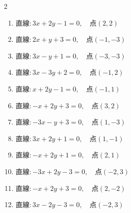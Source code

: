 \begin{multicols}{2}
\begin{enumerate}
  \item $直線:3x+2y-1=0,\quad 点 ( 2, 2 )$


  \item $直線:2x+y+3=0,\quad 点 ( -1, -3 )$


  \item $直線:3x-y+1=0,\quad 点 ( -3, -3 )$


  \item $直線:3x-3y+2=0,\quad 点 ( -1, 2 )$


  \item $直線:x+2y-1=0,\quad 点 ( -1, 1 )$

        \phantom{$\displaystyle 距離 : 0$}

  \item $直線:-x+2y+3=0,\quad 点 ( 3, 2 )$


  \item $直線:-3x-y+3=0,\quad 点 ( 1, -3 )$


\columnbreak %

  \item $直線:3x+2y+1=0,\quad 点 ( 1, -1 )$


  \item $直線:-x+2y+1=0,\quad 点 ( 2, 1 )$


  \item $直線:-3x+2y-3=0,\quad 点 ( -2, 3 )$


  \item $直線:-x+2y+3=0,\quad 点 ( 2, -2 )$


  \item $直線:3x-2y-3=0,\quad 点 ( -2, 3 )$


\end{enumerate}
\end{multicols}
